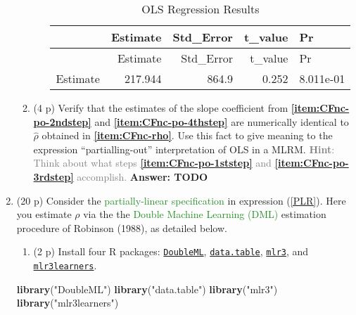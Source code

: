 \documentclass[
]{article}
\newenvironment{Shaded}{\begin{snugshade}}{\end{snugshade}}
\newcommand{\FunctionTok}[1]{\textcolor[rgb]{0.13,0.29,0.53}{\textbf{#1}}}
\newcommand{\NormalTok}[1]{#1}
\newcommand{\StringTok}[1]{\textcolor[rgb]{0.31,0.60,0.02}{#1}}
\providecommand{\tightlist}{%
  \setlength{\itemsep}{0pt}\setlength{\parskip}{0pt}}
\begin{document}
\begin{enumerate}
\begin{enumerate}
\begin{enumerate}
      \begin{longtable}[]{@{}lrrrl@{}}
      \caption{OLS Regression Results}\tabularnewline
      \toprule\noalign{}
      & Estimate & Std\_Error & t\_value & Pr \\
      \midrule\noalign{}
      \endfirsthead
      \toprule\noalign{}
      & Estimate & Std\_Error & t\_value & Pr \\
      \midrule\noalign{}
      \endhead
      \bottomrule\noalign{}
      \endlastfoot
      Estimate & 217.944 & 864.9 & 0.252 & 8.011e-01 \\
      \end{longtable}
    \end{enumerate}
  \item
    (4 p) Verify that the estimates of the slope coefficient from
    \textbf{\ref{item:CFnc-po-2ndstep}} and
    \textbf{\ref{item:CFnc-po-4thstep}} are numerically identical to
    \(\hat{\rho}\) obtained in \textbf{\ref{item:CFnc-rho}}. Use this
    fact to give meaning to the expression ``partialling-out''
    interpretation of OLS in a MLRM.
    \textcolor{gray}{\textbf{Hint}: Think about what steps \textbf{\ref{item:CFnc-po-1ststep}} and \textbf{\ref{item:CFnc-po-3rdstep}} accomplish.}
    \textbf{Answer: TODO} \pagebreak
  \end{enumerate}
\item
  (20 p) Consider the
  \textcolor{ForestGreen}{partially-linear specification} in expression
  (\ref{PLR}). Here you estimate \(\rho\) via the the
  \textcolor{ForestGreen}{Double Machine Learning (DML)} estimation
  procedure of Robinson (1988), as detailed below.\label{item:DML}

  \begin{enumerate}
  \def\labelenumii{\alph{enumii}.}
  \tightlist
  \item
    (2 p) Install four R packages:
    \href{https://docs.doubleml.org/stable/intro/install.html#r-installing-doubleml}{\texttt{DoubleML}},
    \href{https://cran.r-project.org/web/packages/data.table/vignettes/datatable-intro.html}{\texttt{data.table}},
    \href{https://mlr3.mlr-org.com/}{\texttt{mlr3}}, and
    \href{https://mlr3learners.mlr-org.com/}{\texttt{mlr3learners}}.
  \end{enumerate}

\begin{Shaded}
\begin{Highlighting}[]
\FunctionTok{library}\NormalTok{(}\StringTok{"DoubleML"}\NormalTok{)}
\FunctionTok{library}\NormalTok{(}\StringTok{"data.table"}\NormalTok{)}
\FunctionTok{library}\NormalTok{(}\StringTok{"mlr3"}\NormalTok{)}
\FunctionTok{library}\NormalTok{(}\StringTok{"mlr3learners"}\NormalTok{)}
\end{Highlighting}
\end{Shaded}


\end{enumerate}
\end{document}
